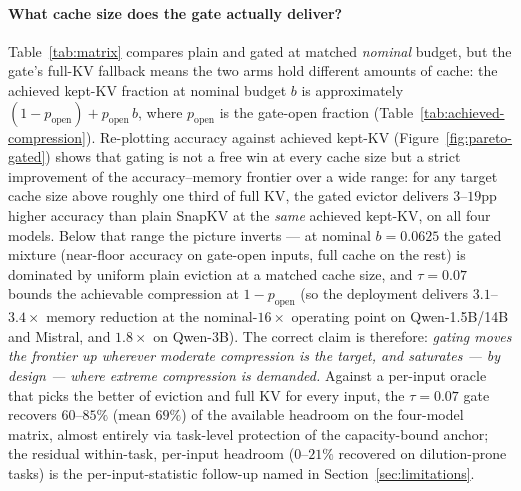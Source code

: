 \documentclass{article}
\begin{document}
\paragraph{What cache size does the gate actually deliver?}
Table~\ref{tab:matrix} compares plain and gated at matched \emph{nominal}
budget, but the gate's full-KV fallback means the two arms hold different
amounts of cache: the achieved kept-KV fraction at nominal budget $b$ is
approximately $(1-p_{\text{open}}) + p_{\text{open}}\,b$, where
$p_{\text{open}}$ is the gate-open fraction
(Table~\ref{tab:achieved-compression}). Re-plotting accuracy against achieved
kept-KV (Figure~\ref{fig:pareto-gated}) shows that gating is not a free win at
every cache size but a strict improvement of the accuracy--memory frontier over
a wide range: for any target cache size above roughly one third of full KV, the
gated evictor delivers $3$--$19$pp higher accuracy than plain SnapKV at the
\emph{same} achieved kept-KV, on all four models. Below that range the picture
inverts --- at nominal $b=0.0625$ the gated mixture (near-floor accuracy on
gate-open inputs, full cache on the rest) is dominated by uniform plain
eviction at a matched cache size, and $\tau=0.07$ bounds the achievable
compression at $1-p_{\text{open}}$ (so the deployment delivers
$3.1$--$3.4\times$ memory reduction at the nominal-$16\times$ operating point
on Qwen-1.5B/14B and Mistral, and $1.8\times$ on Qwen-3B). The correct claim is
therefore: \emph{gating moves the frontier up wherever moderate compression is
the target, and saturates --- by design --- where extreme compression is
demanded.} Against a per-input oracle that picks the better of eviction and
full KV for every input, the $\tau=0.07$ gate recovers $60$--$85\%$ (mean
$69\%$) of the available headroom on the four-model matrix, almost entirely via
task-level protection of the capacity-bound anchor; the residual within-task,
per-input headroom ($0$--$21\%$ recovered on dilution-prone tasks) is the
per-input-statistic follow-up named in Section~\ref{sec:limitations}.
\end{document}
